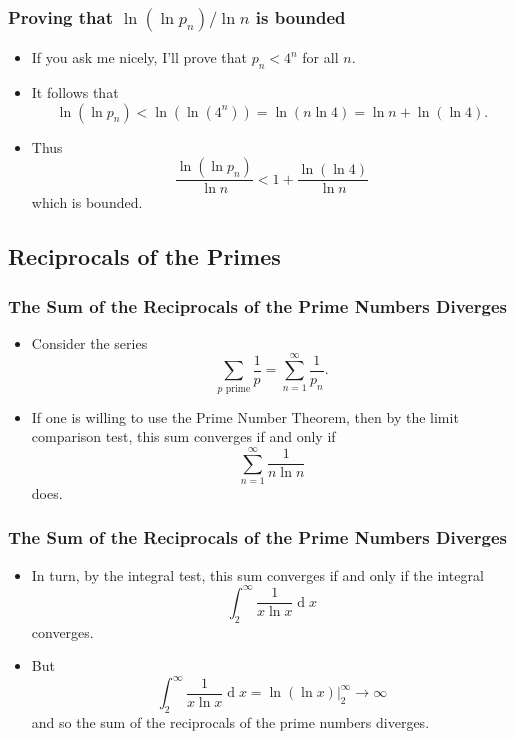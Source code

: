 \documentclass{beamer}
\newcommand{\dif}{\ensuremath{\operatorname{d}\!}}
\begin{document}
\begin{frame}
    \frametitle{Proving that $\ln(\ln p_n) \slash \ln n$ is bounded}

    \begin{itemize}
        \item If you ask me nicely, I'll prove that $p_n < 4^n$ for all $n$. \pause
        \item It follows that
        \[
            \ln(\ln p_n) < \ln\left(\ln\left( 4^n \right)\right) = \ln\left( n \ln 4 \right) = \ln n + \ln(\ln 4).
        \]
        \pause
        \item Thus
        \[
            \frac{\ln(\ln p_n)}{\ln n} < 1 + \frac{\ln(\ln 4)}{\ln n}    
        \]
        which is bounded.
    \end{itemize} 

\end{frame}

\subsection{Reciprocals of the Primes}

\begin{frame}
    \frametitle{The Sum of the Reciprocals of the Prime Numbers Diverges}

    \begin{itemize}
        \item Consider the series
        \[
            \sum_{p \text{ prime}} \frac{1}{p} = \sum_{n = 1}^{\infty} \frac{1}{p_n}.   
        \] \pause
        \item If one is willing to use the Prime Number Theorem, then by the limit comparison test, this sum converges if and only if
        \[
            \sum_{n = 1}^{\infty} \frac{1}{n \ln n}    
        \]
        does.
    \end{itemize} 

\end{frame}

\begin{frame}
    \frametitle{The Sum of the Reciprocals of the Prime Numbers Diverges}

    \begin{itemize}
        \item In turn, by the integral test, this sum converges if and only if the integral
        \[
            \int_2^\infty \frac{1}{x \ln x} \dif x    
        \]
        converges. \pause
        \item But
        \[
            \int_2^\infty \frac{1}{x \ln x} \dif x = \ln(\ln x) \Big|_{2}^{\infty} \to \infty
        \]
        and so the sum of the reciprocals of the prime numbers diverges.
    
    \end{itemize}    

\end{frame}
\end{document}
